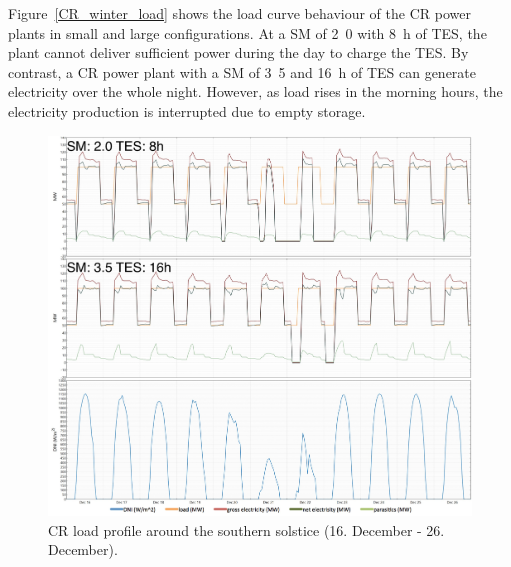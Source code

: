 Figure~\ref{CR_winter_load} shows the load curve behaviour of the CR power plants in small and large configurations. At a SM of \si{2.0} with \SI{8}{h} of TES, the plant cannot deliver sufficient power during the day to charge the TES. By contrast, a CR power plant with a SM of \si{3.5} and \SI{16}{h} of TES can generate electricity over the whole night. However, as load rises in the morning hours, the electricity production is interrupted due to empty storage. 

\begin{figure}[htbp]  
\centering
\includegraphics[width=1\linewidth]{FIG/CR_summer_load}
\caption[CR load profile around the southern solstice.]{CR load profile around the southern solstice (16. December - 26. December).}\label{CR_summer_load}
\end{figure}

